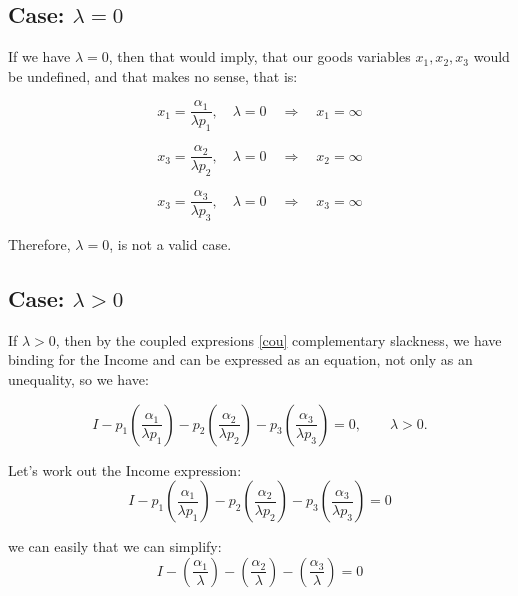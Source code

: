 \documentclass{article}
\begin{document}
\bigskip

\subsection*{Case: $\lambda = 0$}
If we have $\lambda = 0$, then that would imply, that our goods variables $x_1, x_2, x_3 $ would be undefined, and that makes no sense, that is:

\begin{equation}
  x_1 = \frac{\alpha_1}{\lambda p_1}, \quad \lambda = 0 \quad \Rightarrow \quad x_1 = \infty
\end{equation}

\begin{equation}
  x_3 = \frac{\alpha_2}{\lambda p_2}, \quad \lambda = 0 \quad \Rightarrow \quad x_2 = \infty
\end{equation}

\begin{equation}
  x_3 = \frac{\alpha_3}{\lambda p_3}, \quad \lambda = 0 \quad \Rightarrow \quad x_3 = \infty
\end{equation}

Therefore, $\lambda = 0$, is not a valid case.

\subsection*{Case: $\lambda > 0$}
If $\lambda > 0$, then by the coupled expresions \ref{cou} complementary slackness, we have binding for the Income and can be expressed as an equation, not only as an unequality, so we have:

\begin{equation}
   I - p_1 \left( \frac{\alpha_1}{\lambda p_1} \right) - p_2 \left( \frac{\alpha_2}{\lambda p_2} \right) - p_3 \left( \frac{\alpha_3}{\lambda p_3} \right) = 0, \qquad \lambda > 0.
\end{equation}

Let's work out the Income expression:
\begin{equation}
   I - p_1 \left( \frac{\alpha_1}{\lambda p_1} \right) - p_2 \left( \frac{\alpha_2}{\lambda p_2} \right) - p_3 \left( \frac{\alpha_3}{\lambda p_3} \right) = 0
\end{equation}

we can easily that we can simplify:
\begin{equation}
   I - \left( \frac{\alpha_1}{\lambda} \right) - \left( \frac{\alpha_2}{\lambda} \right) - \left( \frac{\alpha_3}{\lambda} \right) = 0
\end{equation}
\end{document}

